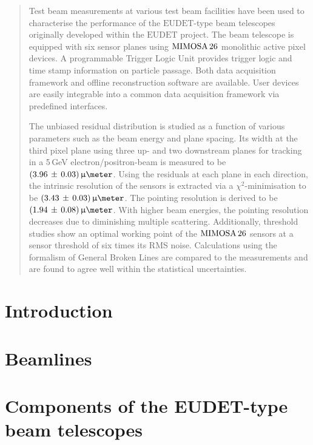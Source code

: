 \documentclass[a4paper,10pt]{scrartcl}
\newcommand{\DESY}{\ensuremath{\textrm{EUDET}}}
\newcommand{\Datura}{\ensuremath{\textrm{DATURA}}}
\newcommand{\Mimosa}{\ensuremath{\textrm{MIMOSA\,26}}}
\newcommand{\eudet}{\ensuremath{\textrm{EUDET}}}
\begin{document}
\begin{abstract}
\noindent
Test beam measurements at various test beam facilities have been used to characterise the performance of the $\DESY$-type beam telescopes originally developed within the $\eudet$ project. %
The beam telescope is equipped with six sensor planes using $\Mimosa$ monolithic active pixel devices. 
A programmable Trigger Logic Unit provides trigger logic and time stamp information on particle passage. 
Both data acquisition framework and offline reconstruction software are available. 
User devices are easily integrable into a common data acquisition framework via predefined interfaces.
 
The unbiased residual distribution is studied as a function of various parameters such as the beam energy and plane spacing.
Its width at the third pixel plane using three up- and two downstream planes for tracking in a 5\,GeV electron/positron-beam is measured to be $(3.96\,\pm\,0.03)\,\upmu\meter$. %
Using the residuals at each plane in each direction, the intrinsic resolution of the sensors is extracted via a $\chi^2$-minimisation to be $(3.43\,\pm\,0.03)\,\upmu\meter$. 
The pointing resolution is derived to be $(1.94\,\pm\,0.08)\,\upmu\meter$.
With higher beam energies, the pointing resolution decreases due to diminishing multiple scattering. 
Additionally, threshold studies show an optimal working point of the $\Mimosa$ sensors at a sensor threshold of six times its RMS noise. 
Calculations using the formalism of General Broken Lines are compared to the measurements and are found to agree well within the statistical uncertainties.
\end{abstract}




\section{Introduction}
\label{sec:intro}


\section{Beamlines}
\label{sec:beamlines}


\section{Components of the EUDET-type beam telescopes}
\label{sec:tscope}

\end{document}
